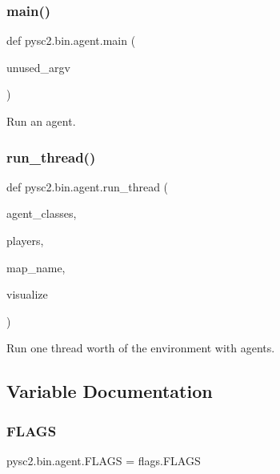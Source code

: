 \mbox{\label{namespacepysc2_1_1bin_1_1agent_a45a775fd3c91bc9ac9f516133e0bf839}} 
\subsubsection{\texorpdfstring{main()}{main()}}
{\footnotesize\ttfamily def pysc2.\+bin.\+agent.\+main (\begin{DoxyParamCaption}\item[{}]{unused\+\_\+argv }\end{DoxyParamCaption})}

\begin{DoxyVerb}Run an agent.\end{DoxyVerb}
 \mbox{\label{namespacepysc2_1_1bin_1_1agent_a50f03896b5536897af2b2808e8132f91}} 
\subsubsection{\texorpdfstring{run\+\_\+thread()}{run\_thread()}}
{\footnotesize\ttfamily def pysc2.\+bin.\+agent.\+run\+\_\+thread (\begin{DoxyParamCaption}\item[{}]{agent\+\_\+classes,  }\item[{}]{players,  }\item[{}]{map\+\_\+name,  }\item[{}]{visualize }\end{DoxyParamCaption})}

\begin{DoxyVerb}Run one thread worth of the environment with agents.\end{DoxyVerb}
 

\subsection{Variable Documentation}
\mbox{\label{namespacepysc2_1_1bin_1_1agent_a2697325d7b7d8ce788e96d6b61315d27}} 
\subsubsection{\texorpdfstring{F\+L\+A\+GS}{FLAGS}}
{\footnotesize\ttfamily pysc2.\+bin.\+agent.\+F\+L\+A\+GS = flags.\+F\+L\+A\+GS}

